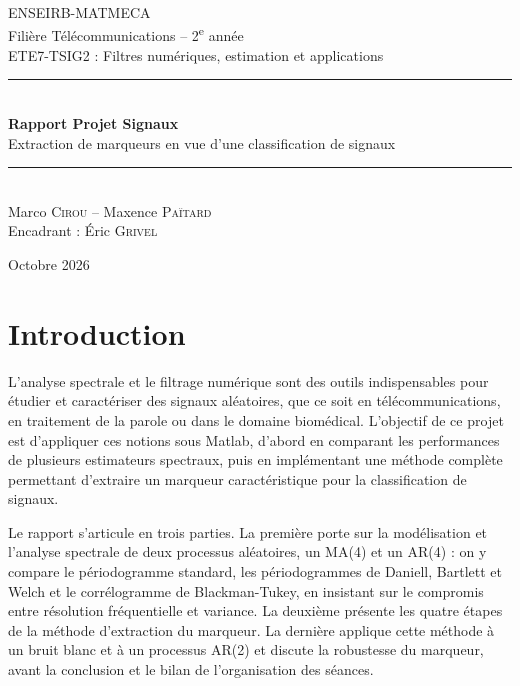 \documentclass[11pt,a4paper]{article}
\begin{document}
\begin{titlepage}
  \centering
  {\large ENSEIRB-MATMECA}\\[0.2cm]
  {\large Filière Télécommunications -- 2\textsuperscript{e} année}\\[0.2cm]
  {\large ETE7-TSIG2 : Filtres numériques, estimation et applications}\\[3cm]

  \rule{\linewidth}{0.5pt}\\[0.4cm]
  {\LARGE\bfseries Rapport Projet Signaux}\\[0.3cm]
  {\large Extraction de marqueurs en vue d'une classification de signaux}\\
  \rule{\linewidth}{0.5pt}\\[3cm]

  {\large Marco \textsc{Cirou} \quad -- \quad Maxence \textsc{Païtard}}\\[1cm]
  {\large Encadrant : Éric \textsc{Grivel}}

  \vfill
  {\large Octobre 2026}
\end{titlepage}

\tableofcontents
\newpage

\section{Introduction}

L'analyse spectrale et le filtrage numérique sont des outils indispensables pour étudier et caractériser des signaux aléatoires, que ce soit en télécommunications, en traitement de la parole ou dans le domaine biomédical. L'objectif de ce projet est d'appliquer ces notions sous Matlab, d'abord en comparant les performances de plusieurs estimateurs spectraux, puis en implémentant une méthode complète permettant d'extraire un marqueur caractéristique pour la classification de signaux.

Le rapport s'articule en trois parties. La première porte sur la modélisation et l'analyse spectrale de deux processus aléatoires, un MA(4) et un AR(4) : on y compare le périodogramme standard, les périodogrammes de Daniell, Bartlett et Welch et le corrélogramme de Blackman-Tukey, en insistant sur le compromis entre résolution fréquentielle et variance. La deuxième présente les quatre étapes de la méthode d'extraction du marqueur. La dernière applique cette méthode à un bruit blanc et à un processus AR(2) et discute la robustesse du marqueur, avant la conclusion et le bilan de l'organisation des séances.
\end{document}

